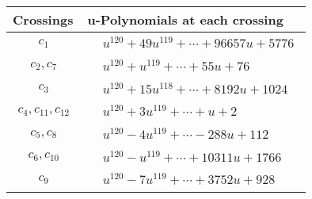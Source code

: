 \documentclass[1p]{elsarticle_modified}
\theoremstyle{definition}
\begin{document}
\begin{tabular}{m{50pt}|m{274pt}}
Crossings & \hspace{64pt}u-Polynomials at each crossing \\
\hline $$\begin{aligned}c_{1}\end{aligned}$$&$\begin{aligned}
&u^{120}+49 u^{119}+\cdots+96657 u+5776
\end{aligned}$\\
\hline $$\begin{aligned}c_{2},c_{7}\end{aligned}$$&$\begin{aligned}
&u^{120}+u^{119}+\cdots+55 u+76
\end{aligned}$\\
\hline $$\begin{aligned}c_{3}\end{aligned}$$&$\begin{aligned}
&u^{120}+15 u^{118}+\cdots+8192 u+1024
\end{aligned}$\\
\hline $$\begin{aligned}c_{4},c_{11},c_{12}\end{aligned}$$&$\begin{aligned}
&u^{120}+3 u^{119}+\cdots+u+2
\end{aligned}$\\
\hline $$\begin{aligned}c_{5},c_{8}\end{aligned}$$&$\begin{aligned}
&u^{120}-4 u^{119}+\cdots-288 u+112
\end{aligned}$\\
\hline $$\begin{aligned}c_{6},c_{10}\end{aligned}$$&$\begin{aligned}
&u^{120}- u^{119}+\cdots+10311 u+1766
\end{aligned}$\\
\hline $$\begin{aligned}c_{9}\end{aligned}$$&$\begin{aligned}
&u^{120}-7 u^{119}+\cdots+3752 u+928
\end{aligned}$\\
\hline
\end{tabular}\\~\\
\newpage\renewcommand{\arraystretch}{1}
\end{document}

